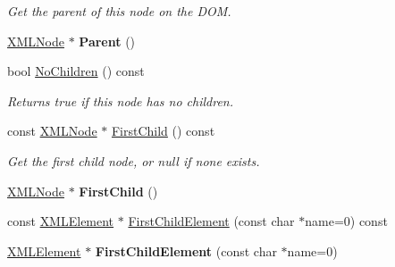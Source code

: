 \begin{DoxyCompactItemize}
\begin{DoxyCompactList}\small\item\em Get the parent of this node on the D\+OM. \end{DoxyCompactList}\item 
\hyperlink{classtinyxml2_1_1XMLNode}{X\+M\+L\+Node} $\ast$ {\bfseries Parent} ()\hypertarget{classtinyxml2_1_1XMLNode_a76029693a5a54fbb721a41d7a0ca8a97}{}\label{classtinyxml2_1_1XMLNode_a76029693a5a54fbb721a41d7a0ca8a97}

\item 
bool \hyperlink{classtinyxml2_1_1XMLNode_a96afe34a9ccd0ed4c0cff32beb42cc6c}{No\+Children} () const \hypertarget{classtinyxml2_1_1XMLNode_a96afe34a9ccd0ed4c0cff32beb42cc6c}{}\label{classtinyxml2_1_1XMLNode_a96afe34a9ccd0ed4c0cff32beb42cc6c}

\begin{DoxyCompactList}\small\item\em Returns true if this node has no children. \end{DoxyCompactList}\item 
const \hyperlink{classtinyxml2_1_1XMLNode}{X\+M\+L\+Node} $\ast$ \hyperlink{classtinyxml2_1_1XMLNode_a60e923d13d7dc01f45ab90a2f948b02a}{First\+Child} () const \hypertarget{classtinyxml2_1_1XMLNode_a60e923d13d7dc01f45ab90a2f948b02a}{}\label{classtinyxml2_1_1XMLNode_a60e923d13d7dc01f45ab90a2f948b02a}

\begin{DoxyCompactList}\small\item\em Get the first child node, or null if none exists. \end{DoxyCompactList}\item 
\hyperlink{classtinyxml2_1_1XMLNode}{X\+M\+L\+Node} $\ast$ {\bfseries First\+Child} ()\hypertarget{classtinyxml2_1_1XMLNode_a2d6c70c475146b48bc93a7fafdeff5e0}{}\label{classtinyxml2_1_1XMLNode_a2d6c70c475146b48bc93a7fafdeff5e0}

\item 
const \hyperlink{classtinyxml2_1_1XMLElement}{X\+M\+L\+Element} $\ast$ \hyperlink{classtinyxml2_1_1XMLNode_a4a38e0da23f4d97673a86c77d5cae5c2}{First\+Child\+Element} (const char $\ast$name=0) const 
\item 
\hyperlink{classtinyxml2_1_1XMLElement}{X\+M\+L\+Element} $\ast$ {\bfseries First\+Child\+Element} (const char $\ast$name=0)\hypertarget{classtinyxml2_1_1XMLNode_af1e0e475cc27d5e7eeaf4d732691b741}{}\label{classtinyxml2_1_1XMLNode_af1e0e475cc27d5e7eeaf4d732691b741}


\end{DoxyCompactItemize}
